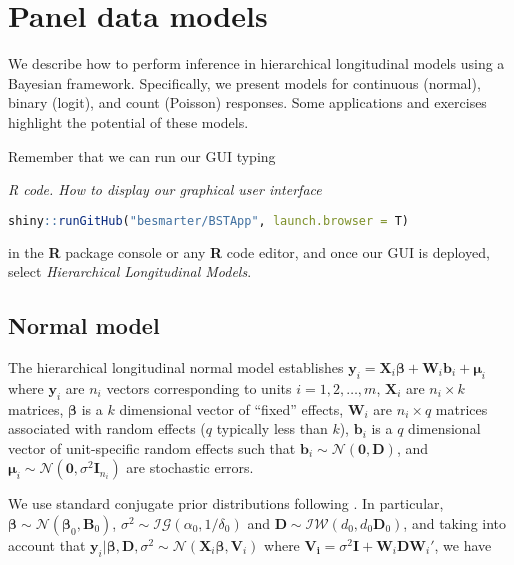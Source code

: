\chapter{Panel data models}\label{chap9}

We describe how to perform inference in hierarchical longitudinal models using a Bayesian framework. Specifically, we present models for continuous (normal), binary (logit), and count (Poisson) responses. Some applications and exercises highlight the potential of these models.

Remember that we can run our GUI typing

\begin{tcolorbox}[enhanced,width=4.67in,center upper,
	fontupper=\large\bfseries,drop shadow southwest,sharp corners]
	\textit{R code. How to display our graphical user interface}
	\begin{VF}
		\begin{lstlisting}[language=R]
		shiny::runGitHub("besmarter/BSTApp", launch.browser = T)
		\end{lstlisting}
	\end{VF}
\end{tcolorbox} 

in the \textbf{R} package console or any \textbf{R} code editor, and once our GUI is deployed, select \textit{Hierarchical Longitudinal Models}.

\section{Normal model}\label{sec91}

The hierarchical longitudinal normal model establishes $\bm{y}_i=\bm{X}_i\bm{\beta}+\bm{W}_i\bm{b}_i+\bm{\mu}_i$ where $\bm{y}_i$ are $n_i$ vectors corresponding to units $i=1,2,\dots,m$, $\bm{X}_i$ are $n_i\times k$ matrices, $\bm{\beta}$ is a $k$ dimensional vector of ``fixed'' effects, $\bm{W}_i$ are $n_i\times q$ matrices associated with random effects ($q$ typically less than $k$), $\bm{b}_i$ is a $q$ dimensional vector of unit-specific random effects such that $\bm{b}_i\sim\mathcal{N}(\bm{0},\bm{D})$, and $\bm{\mu}_i\sim\mathcal{N}(\bm{0},\sigma^2\bm{I}_{n_i})$ are stochastic errors.

We use standard conjugate prior distributions following \cite{Chib1999}.
In particular, $\bm{\beta} \sim \mathcal{N}(\bm{\beta}_0,\bm{B}_0)$, 
$\sigma^2 \sim \mathcal{I}\mathcal{G}(\alpha_0, 1/\delta_0)$ and $\bm{D}\sim\mathcal{I}\mathcal{W}(d_0,d_0\bm{D}_0)$, and taking into account that $\bm{y}_i|\bm{\beta},\bm{D},\sigma^2\sim\mathcal{N}(\bm{X}_i\bm{\beta},\bm{V}_i)$ where $\bm{V_i}=\sigma^2\bm{I}+\bm{W}_i\bm{D}\bm{W}_i'$, we have

